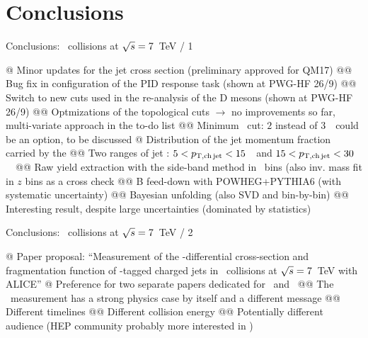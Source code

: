 \documentclass[xcolor={usenames,dvipsnames}, aspectratio=169]{beamer}
\begin{document}
\section{Conclusions}

\begin{frame}[fragile]{Conclusions: \pp\ collisions at $\sqrt{s}=7$~TeV / 1}
\footnotesize
\begin{easylist}[itemize]
@ Minor updates for the jet cross section (preliminary approved for QM17)
@@ Bug fix in configuration of the PID response task (shown at PWG-HF 26/9)
@@ Switch to new cuts used in the re-analysis of the D mesons (shown at PWG-HF 26/9)
@@ Optmizations of the topological cuts $\rightarrow$ no improvements so far, multi-variate approach in the to-do list
@@ Minimum \ptd\ cut: $2$ instead of $3$~\GeVc\ could be an option, to be discussed
@ Distribution of the jet momentum fraction carried by the \Dzero
@@ Two ranges of jet \pt: $5<p_{\mathrm{T,ch\, jet}}<15$~\GeVc\ and $15<p_{\mathrm{T,ch\, jet}}<30$~\GeVc\
@@ Raw yield extraction with the side-band method in \ptd\ bins (also inv. mass fit in $z$ bins as a cross check
@@ B feed-down with POWHEG+PYTHIA6 (with systematic uncertainty)
@@ Bayesian unfolding (also SVD and bin-by-bin)
@@ Interesting result, despite large uncertainties (dominated by statistics)
\end{easylist}
\end{frame}

\begin{frame}[fragile]{Conclusions: \pp\ collisions at $\sqrt{s}=7$~TeV / 2}
\begin{easylist}[itemize]
@ Paper proposal: ``Measurement of the \pt-differential cross-section and fragmentation function of \Dzero-tagged charged jets in \pp\ collisions at $\sqrt{s}=7$~TeV with ALICE''
@ Preference for two separate papers dedicated for \pp\ and \pPb\
@@ The \pp\ measurement has a strong physics case by itself and a different message
@@ Different timelines
@@ Different collision energy
@@ Potentially different audience (HEP community probably more interested in \pp)
\end{easylist}
\end{frame}
\end{document}
